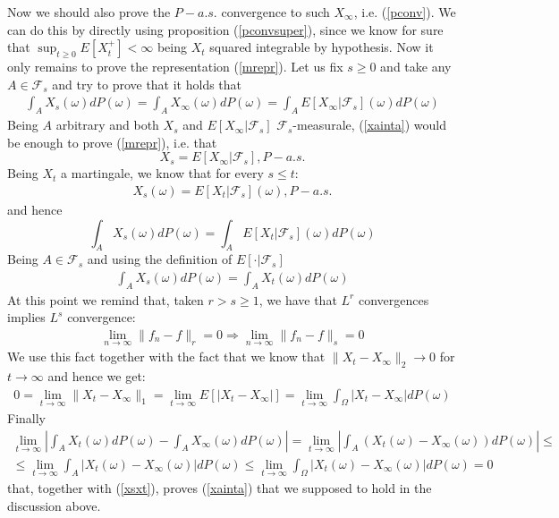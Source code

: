 \documentclass[a4paper,10pt]{report}
\theoremstyle{plain}
\theoremstyle{definition}
\newcommand\be{\begin{eqnarray}}    %
\newcommand\ee{\end{eqnarray}}
\newcommand{\FF} {\mathcal{F} }
\newcommand{\DPO} {dP(\omega) }
\begin{document}
Now we should also prove the $P-a.s.$ convergence to such $X_\infty$, i.e. (\ref{pconv}). We can do this by directly using proposition (\ref{pconvsuper}), since we know for sure that $\sup_{t\geq 0} E[X_t^+]<\infty$ being $X_t$ squared integrable by hypothesis. 
Now it only remains to prove the representation (\ref{mrepr}). Let us fix $s\geq 0$ and take any $A\in \FF_s$ and try to prove that it holds that  
\be
\int_A X_s(\omega) \DPO=\int_A X_\infty(\omega) \DPO=\int_A E[X_\infty|\FF_s](\omega) \DPO
\label{xainta}
\ee
Being $A$ arbitrary and both $X_s$ and $E[X_\infty|\FF_s]$ $\FF_s$-measurale, (\ref{xainta}) would be enough to prove (\ref{mrepr}), i.e. that 
\[
X_s=E[X_\infty|\FF_s], P-a.s.
\]
Being $X_t$ a martingale, we know that for every $s \leq t$:
\be
X_s(\omega)=E[X_t|\FF_s](\omega), P-a.s.
\ee
and hence 
\[
\int_A X_s(\omega) \DPO = \int_A E[X_t|\FF_s](\omega) \DPO
\]
Being $A\in \FF_s$ and using the definition of $E[\cdot|\FF_s]$
\be
\int_A X_s(\omega) \DPO = \int_A X_t(\omega) \DPO
\label{xsxt}
\ee
At this point we remind that, taken $r>s\geq 1$, we have that $L^r$ convergences implies $L^s$ convergence:
\be 
\lim_{n \rightarrow \infty} \|f_n - f\|_r =0 \Rightarrow \lim_{n \rightarrow \infty} \|f_n - f\|_s =0 
\ee
We use this fact together with the fact that we know that $\|X_t-X_\infty\|_2\rightarrow 0$ for $t\rightarrow \infty
$ and hence we get:
\be 
0=\lim_{t\rightarrow \infty}\|X_t-X_\infty\|_1=\lim_{t\rightarrow \infty}E[|X_t-X_\infty|]=\lim_{t\rightarrow \infty}\int_\Omega |X_t-X_\infty|\DPO
\ee
Finally
\be
\lim_{t\rightarrow \infty}\left| \int_A X_t(\omega) \DPO - \int_A X_\infty(\omega) \DPO\right|=\lim_{t\rightarrow \infty}\left| \int_A \left(X_t(\omega) - X_\infty(\omega)\right) \DPO\right|\leq \\
\leq \lim_{t\rightarrow \infty} \int_A \left|X_t(\omega) - X_\infty(\omega)\right| \DPO\leq \lim_{t\rightarrow \infty} \int_\Omega \left|X_t(\omega) - X_\infty(\omega)\right| \DPO=0
\ee
that, together with (\ref{xsxt}), proves (\ref{xainta}) that we supposed to hold in the discussion above.
\end{document}
